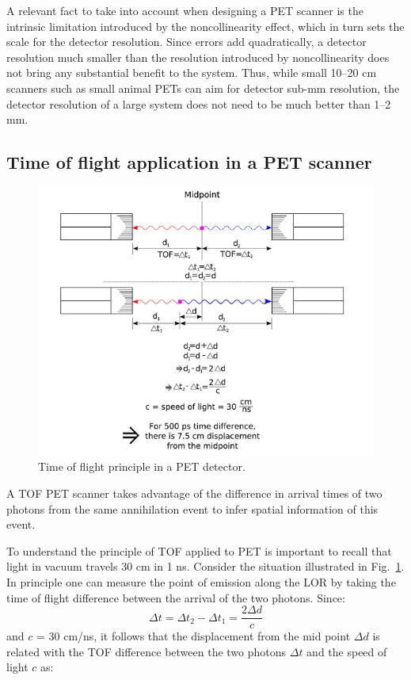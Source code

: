 \documentclass[review]{elsarticle}
\begin{document}
A relevant fact to take into account when designing a PET scanner is the intrinsic limitation introduced by the noncollinearity effect, which in turn sets the scale for the detector resolution. Since errors add quadratically, a detector resolution much smaller than the resolution introduced by noncollinearity does not bring any substantial benefit to the system. Thus, while small 10--20 cm scanners such as small animal PETs can aim for detector sub-mm resolution, the detector resolution of a large system does not need to be much better than 1--2 mm. 

\subsection*{Time of flight application in a PET scanner}

\begin{figure}[!bthp]
	\centering
	\includegraphics[scale=0.5]{../img/MAPD_tofprinciple.jpg}
	\caption{\label{fig.tof} Time of flight principle in a PET detector.}
\end{figure}

A TOF PET scanner takes advantage of the difference in arrival times of two photons from the same annihilation event to infer spatial information of this event. 

To understand the principle of TOF applied to PET is important to recall that light in vacuum travels 30 cm in 1 ns. Consider the situation illustrated in Fig.~\ref{fig.tof}. In principle one can measure the point of emission along the LOR by taking the time of flight difference between the arrival of the two photons. Since:
\begin{equation}
\Delta t = \Delta t_2 - \Delta t_1 = \frac{2 \Delta d}{c}
\end{equation}
%
and $c$ = 30 cm/ns, it follows that the displacement from the mid point
$\Delta d$ is related with the TOF difference between the two photons $\Delta t$ and the speed of light $c$ as:
\end{document}
